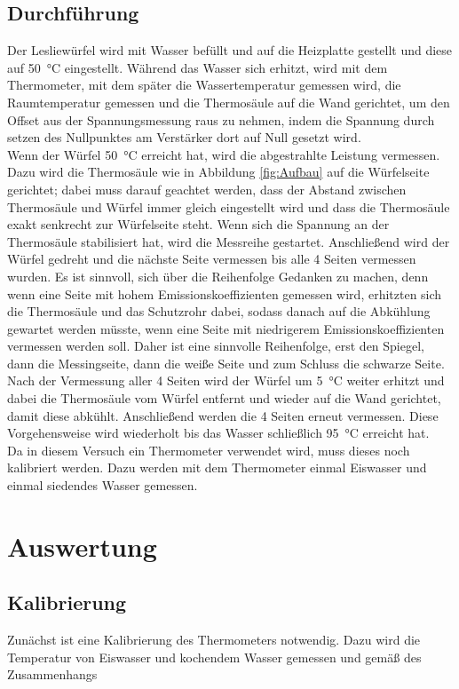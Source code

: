 \documentclass[12pt,a4paper]{article}
\begin{document}
\subsection{Durchführung}
Der Lesliewürfel wird mit Wasser befüllt und auf die Heizplatte gestellt und diese auf \SI{50}{\celsius} eingestellt. Während das Wasser sich erhitzt, wird mit dem Thermometer, mit dem später die Wassertemperatur gemessen wird, die Raumtemperatur gemessen und die Thermosäule auf die Wand gerichtet, um den Offset aus der Spannungsmessung raus zu nehmen, indem die Spannung durch setzen des Nullpunktes am Verstärker dort auf Null gesetzt wird. \\
Wenn der Würfel \SI{50}{\celsius} erreicht hat, wird die abgestrahlte Leistung vermessen. Dazu wird die Thermosäule wie in Abbildung \ref{fig:Aufbau} auf die Würfelseite gerichtet; dabei muss darauf geachtet werden, dass der Abstand zwischen Thermosäule und Würfel immer gleich eingestellt wird und dass die Thermosäule exakt senkrecht zur Würfelseite steht. Wenn sich die Spannung an der Thermosäule stabilisiert hat, wird die Messreihe gestartet. Anschließend wird der Würfel gedreht und die nächste Seite vermessen bis alle 4 Seiten vermessen wurden. Es ist sinnvoll, sich über die Reihenfolge Gedanken zu machen, denn wenn eine Seite mit hohem Emissionskoeffizienten gemessen wird, erhitzten sich die Thermosäule und das Schutzrohr dabei, sodass danach auf die Abkühlung gewartet werden müsste, wenn eine Seite mit niedrigerem Emissionskoeffizienten vermessen werden soll. Daher ist eine sinnvolle Reihenfolge, erst den Spiegel, dann die Messingseite, dann die weiße Seite und zum Schluss die schwarze Seite.\\
Nach der Vermessung aller 4 Seiten wird der Würfel um  \SI{5}{\celsius} weiter erhitzt und dabei die Thermosäule vom Würfel entfernt und wieder auf die Wand gerichtet, damit diese abkühlt. Anschließend werden die 4 Seiten erneut vermessen. Diese Vorgehensweise wird wiederholt bis das Wasser schließlich \SI{95}{\celsius} erreicht hat.\\
Da in diesem Versuch ein Thermometer verwendet wird, muss dieses noch kalibriert werden. Dazu werden mit dem Thermometer einmal Eiswasser und einmal siedendes Wasser gemessen.

\section{Auswertung}

\subsection{Kalibrierung}
Zunächst ist eine Kalibrierung des Thermometers notwendig. Dazu wird die Temperatur von Eiswasser und kochendem Wasser gemessen und gemäß des Zusammenhangs
 
\end{document}

